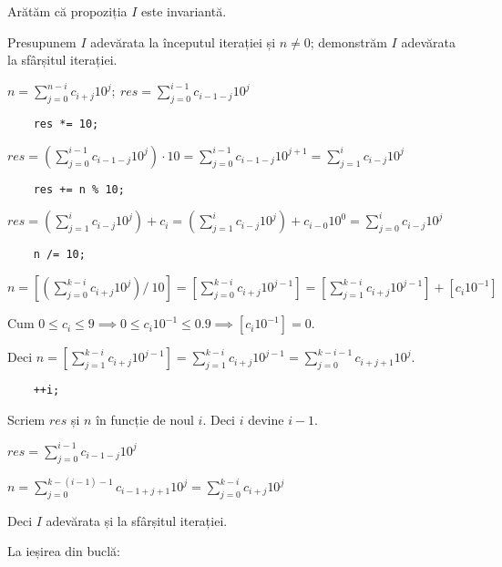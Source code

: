 \documentclass[11pt]{article}
\begin{document}
Arătăm că propoziția $I$ este invariantă.

Presupunem $I$ adevărata la începutul iterației și $n \ne 0$; demonstrăm $I$ adevărata la sfârșitul iterației.

$n = \sum\limits_{j=0}^{n-i}c_{i+j}10^{j};\ 
\mathit{res} = \sum\limits_{j=0}^{i-1}c_{i-1-j}10^{j}
$
\begin{verbatim}
    res *= 10;
\end{verbatim}

$\mathit{res} = \left( \sum\limits_{j=0}^{i-1}c_{i-1-j}10^{j} \right) \cdot 10 
= \sum\limits_{j=0}^{i-1}c_{i-1-j}10^{j+1} 
= \sum\limits_{j=1}^{i}c_{i-j}10^{j}
$
\begin{verbatim}
    res += n % 10;
\end{verbatim}

$\mathit{res} = \left( \sum\limits_{j=1}^{i}c_{i-j}10^{j} \right) + c_{i} 
= \left( \sum\limits_{j=1}^{i}c_{i-j}10^{j} \right) + c_{i-0}10^{0} 
= \sum\limits_{j=0}^{i}c_{i-j}10^{j}$

\begin{verbatim}
    n /= 10;
\end{verbatim}

$n = \left[ \left( \sum\limits_{j=0}^{k-i}c_{i+j}10^{j} \right) / \ 10 \right]
= \left[ \sum\limits_{j=0}^{k-i}c_{i+j}10^{j-1} \right]
= \left[ \sum\limits_{j=1}^{k-i}c_{i+j}10^{j-1} \right] + \left[c_{i}10^{-1} \right]
$

Cum $0 \le c_{i} \le 9 \implies 0 \le c_{i}10^{-1} \le 0.9 \implies \left[c_{i}10^{-1} \right] = 0$.

Deci $n = \left[ \sum\limits_{j=1}^{k-i}c_{i+j}10^{j-1} \right] = \sum\limits_{j=1}^{k-i}c_{i+j}10^{j-1} = \sum\limits_{j=0}^{k-i-1}c_{i+j+1}10^{j}$. 

\begin{verbatim}
    ++i;
\end{verbatim}

Scriem $\mathit{res}$ și $n$ în funcție de noul $i$. Deci $i$ devine $i-1$.


$\mathit{res} = \sum\limits_{j=0}^{i-1}c_{i-1-j}10^{j}$

$n = \sum\limits_{j=0}^{k-(i-1)-1}c_{i-1+j+1}10^{j} = \sum\limits_{j=0}^{k-i}c_{i+j}10^{j} $

Deci $I$ adevărata și la sfârșitul iterației.


\vspace{14pt}
La ieșirea din buclă:
\end{document}
